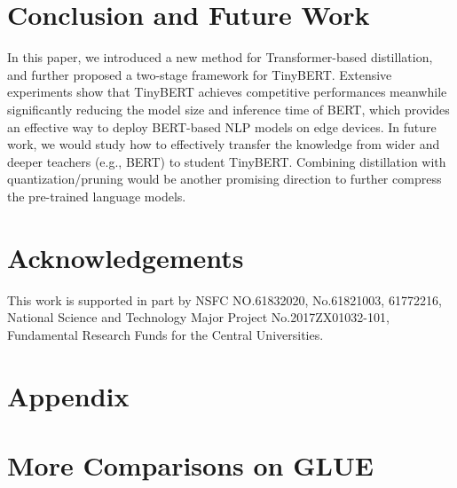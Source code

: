 \documentclass[11pt,a4paper]{article}
\begin{document}
%
 
\section{Conclusion and Future Work}
In this paper, we introduced a new method for Transformer-based distillation, and further proposed a two-stage framework for TinyBERT. Extensive experiments show that TinyBERT achieves competitive performances meanwhile significantly reducing the model size and inference time of BERT, which provides an effective way to deploy BERT-based NLP models on edge devices. 
In future work, we would study how to effectively transfer the knowledge from wider and deeper teachers (e.g., BERT) to student TinyBERT. Combining distillation with quantization/pruning would be another promising direction to further compress the pre-trained language models.
\label{sec:con} 
\section*{Acknowledgements}
This work is supported in part by NSFC NO.61832020, No.61821003, 61772216, National Science and Technology Major Project No.2017ZX01032-101, Fundamental Research Funds for the Central Universities.




\appendix
\section*{Appendix}
\label{sec:appx}

\section{More Comparisons on GLUE}
\label{apx:more_compar}
\end{document}
